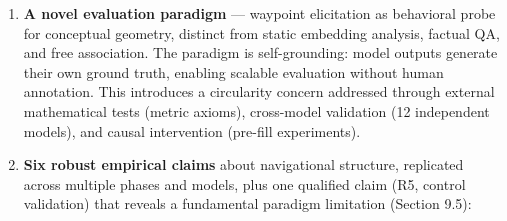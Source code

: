 \begin{enumerate}
\def\labelenumi{\arabic{enumi}.}
\item
  \textbf{A novel evaluation paradigm} --- waypoint elicitation as behavioral probe for conceptual geometry, distinct from static embedding analysis, factual QA, and free association. The paradigm is self-grounding: model outputs generate their own ground truth, enabling scalable evaluation without human annotation. This introduces a circularity concern addressed through external mathematical tests (metric axioms), cross-model validation (12 independent models), and causal intervention (pre-fill experiments).
\item
  \textbf{Six robust empirical claims} about navigational structure, replicated across multiple phases and models, plus one qualified claim (R5, control validation) that reveals a fundamental paradigm limitation (Section 9.5):


\end{enumerate}
